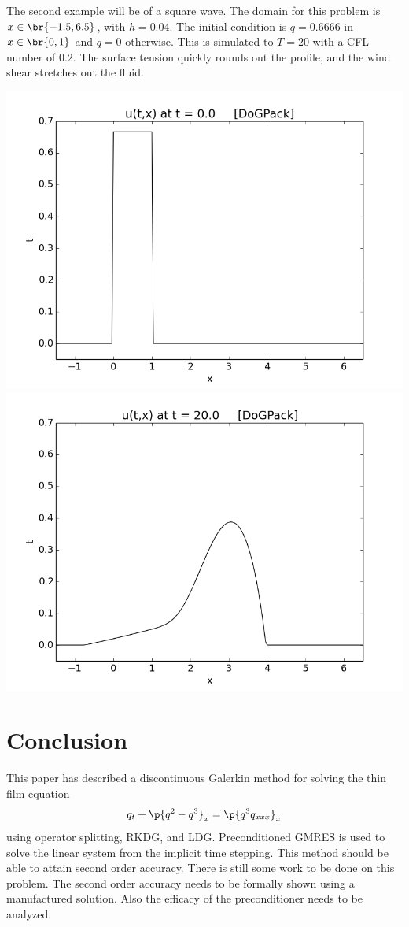 \documentclass[11pt, oneside]{article}
\begin{document}
  The second example will be of a square wave.
  The domain for this problem is $x \in \br{-1.5, 6.5}$, with $h = 0.04$.
  The initial condition is $q = 0.6666$ in $x \in \br{0, 1}$ and $q = 0$
  otherwise.
  This is simulated to $T = 20$ with a CFL number of $0.2$.
  The surface tension quickly rounds out the profile, and the wind shear
  stretches out the fluid.
  \begin{center}
    \includegraphics[scale=0.4]{Figures/squareWaveInitial.png}
    \includegraphics[scale=0.4]{Figures/squareWaveFinal.png}
  \end{center}

\section{Conclusion}
  This paper has described a discontinuous Galerkin method for solving the
  thin film equation
  \[
    q_t + \p{q^2 - q^3}_x = \p{q^3 q_{xxx}}_x
  \]
  using operator splitting, RKDG, and LDG.
  Preconditioned GMRES is used to solve the linear system from the implicit
  time stepping.
  This method should be able to attain second order accuracy.
  There is still some work to be done on this problem.
  The second order accuracy needs to be formally shown using a manufactured
  solution.
  Also the efficacy of the preconditioner needs to be analyzed.

  \printbibliography{}
\end{document}
